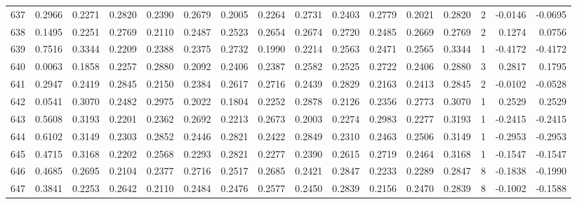 \begin{tabular}{lrrrrrrrrrrrrrrr}
637 &      0.2966 &  0.2271 &  0.2820 &  0.2390 &  0.2679 &  0.2005 &  0.2264 &  0.2731 &  0.2403 &  0.2779 &   0.2021 &     0.2820 &      2 &                   -0.0146 &                    -0.0695 \\
638 &      0.1495 &  0.2251 &  0.2769 &  0.2110 &  0.2487 &  0.2523 &  0.2654 &  0.2674 &  0.2720 &  0.2485 &   0.2669 &     0.2769 &      2 &                    0.1274 &                     0.0756 \\
639 &      0.7516 &  0.3344 &  0.2209 &  0.2388 &  0.2375 &  0.2732 &  0.1990 &  0.2214 &  0.2563 &  0.2471 &   0.2565 &     0.3344 &      1 &                   -0.4172 &                    -0.4172 \\
640 &      0.0063 &  0.1858 &  0.2257 &  0.2880 &  0.2092 &  0.2406 &  0.2387 &  0.2582 &  0.2525 &  0.2722 &   0.2406 &     0.2880 &      3 &                    0.2817 &                     0.1795 \\
641 &      0.2947 &  0.2419 &  0.2845 &  0.2150 &  0.2384 &  0.2617 &  0.2716 &  0.2439 &  0.2829 &  0.2163 &   0.2413 &     0.2845 &      2 &                   -0.0102 &                    -0.0528 \\
642 &      0.0541 &  0.3070 &  0.2482 &  0.2975 &  0.2022 &  0.1804 &  0.2252 &  0.2878 &  0.2126 &  0.2356 &   0.2773 &     0.3070 &      1 &                    0.2529 &                     0.2529 \\
643 &      0.5608 &  0.3193 &  0.2201 &  0.2362 &  0.2692 &  0.2213 &  0.2673 &  0.2003 &  0.2274 &  0.2983 &   0.2277 &     0.3193 &      1 &                   -0.2415 &                    -0.2415 \\
644 &      0.6102 &  0.3149 &  0.2303 &  0.2852 &  0.2446 &  0.2821 &  0.2422 &  0.2849 &  0.2310 &  0.2463 &   0.2506 &     0.3149 &      1 &                   -0.2953 &                    -0.2953 \\
645 &      0.4715 &  0.3168 &  0.2202 &  0.2568 &  0.2293 &  0.2821 &  0.2277 &  0.2390 &  0.2615 &  0.2719 &   0.2464 &     0.3168 &      1 &                   -0.1547 &                    -0.1547 \\
646 &      0.4685 &  0.2695 &  0.2104 &  0.2377 &  0.2716 &  0.2517 &  0.2685 &  0.2421 &  0.2847 &  0.2233 &   0.2289 &     0.2847 &      8 &                   -0.1838 &                    -0.1990 \\
647 &      0.3841 &  0.2253 &  0.2642 &  0.2110 &  0.2484 &  0.2476 &  0.2577 &  0.2450 &  0.2839 &  0.2156 &   0.2470 &     0.2839 &      8 &                   -0.1002 &                    -0.1588 \\

\end{tabular}
